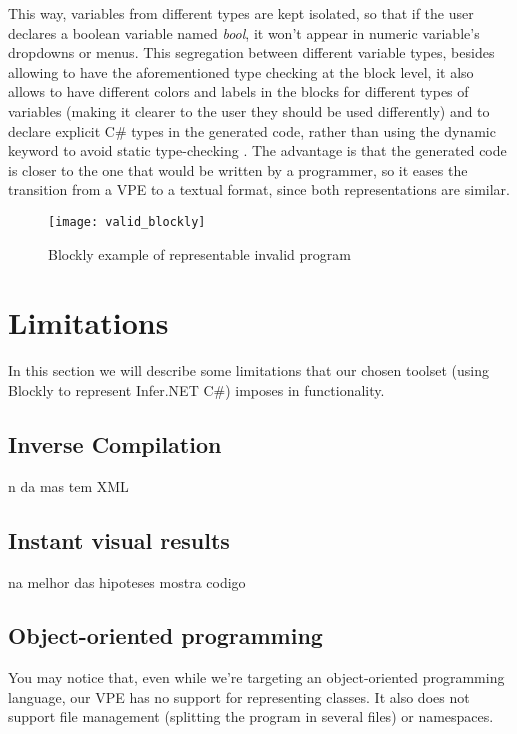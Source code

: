 This way, variables from different types are kept isolated, so that if the user
declares a boolean variable named \textit{bool}, it won't appear in numeric
variable's dropdowns or menus. This segregation between different variable types,
besides allowing to have the aforementioned type checking at the block level, it
also allows to have different colors and labels in the blocks for different types of variables
(making it clearer to the user they should be used differently) and to declare
explicit C# types in the generated code, rather than using
the dynamic keyword to avoid static type-checking \cite{cdyn}. The advantage is that
the generated code is closer to the one that would be written by a programmer,
so it eases the transition from a VPE to a textual format, since both representations
are similar.

\begin{figure}[t]
  \begin{center}
    \leavevmode
    \texttt{[image: valid\_blockly]}
    \caption{Blockly example of representable invalid program}
    \label{fig:valid_blockly}
  \end{center}
\end{figure}

\section{Limitations}

In this section we will describe some limitations that our chosen toolset (using
Blockly to represent Infer.NET C#) imposes in functionality.

\subsection{Inverse Compilation}

n da mas tem XML

\subsection{Instant visual results}

na melhor das hipoteses mostra codigo

\subsection{Object-oriented programming}

You may notice that, even while we're targeting an object-oriented programming
language, our VPE has no support for representing classes. It also does not
support file management (splitting the program in several files) or namespaces.

